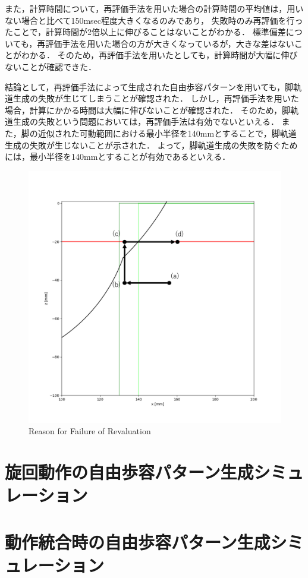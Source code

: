 また，計算時間について，再評価手法を用いた場合の計算時間の平均値は，用いない場合と比べて150msec程度大きくなるのみであり，
失敗時のみ再評価を行ったことで，計算時間が2倍以上に伸びることはないことがわかる．
標準偏差についても，再評価手法を用いた場合の方が大きくなっているが，大きな差はないことがわかる．
そのため，再評価手法を用いたとしても，計算時間が大幅に伸びないことが確認できた．

結論として，再評価手法によって生成された自由歩容パターンを用いても，脚軌道生成の失敗が生じてしまうことが確認された．
しかし，再評価手法を用いた場合，計算にかかる時間は大幅に伸びないことが確認された．
そのため，脚軌道生成の失敗という問題においては，再評価手法は有効でないといえる．
また，脚の近似された可動範囲における最小半径を140mmとすることで，脚軌道生成の失敗が生じないことが示された．
よって，脚軌道生成の失敗を防ぐためには，最小半径を140mmとすることが有効であるといえる．

\begin{figure}[htbp]
  \centering
  \includegraphics[width=0.5\linewidth]{figure/chapter4/revaluation_reason.png}
  \caption{Reason for Failure of Revaluation}
  \label{fig:ch5_revaluation_reason} %
\end{figure}

\section{旋回動作の自由歩容パターン生成シミュレーション}


\section{動作統合時の自由歩容パターン生成シミュレーション}
